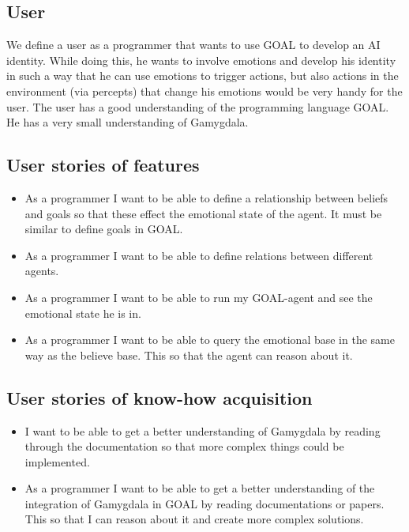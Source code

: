 \documentclass[]{article}
\begin{document}
\subsection{User}
We define a user as a programmer that wants to use GOAL to develop an AI identity. While doing this, he wants to involve emotions and develop his identity in such a way that he can use emotions to trigger actions, but also actions in the environment (via percepts) that change his emotions would be very handy for the user. The user has a good understanding of the programming language GOAL. He has a very small understanding of Gamygdala.
\subsection{User stories of features}
\begin{itemize}
\item As a programmer I want to be able to define a relationship between beliefs and goals so that these effect the emotional state of the agent. It must be similar to define goals in GOAL.

\item As a programmer I want to be able to define relations between different agents.

\item As a programmer I want to be able to run my GOAL-agent and see the emotional state he is in.

\item As a programmer I want to be able to query the emotional base in the same way as the believe base. This so that the agent can reason about it.
\end{itemize}

\subsection{User stories of know-how acquisition}
\begin{itemize}
\item I want to be able to get a better understanding of Gamygdala by reading through the documentation so that more complex things could be implemented.

\item As a programmer I want to be able to get a better understanding of the integration of Gamygdala in GOAL by reading documentations or papers. This so that I can reason about it and create more complex solutions.
\end{itemize}
\end{document}
